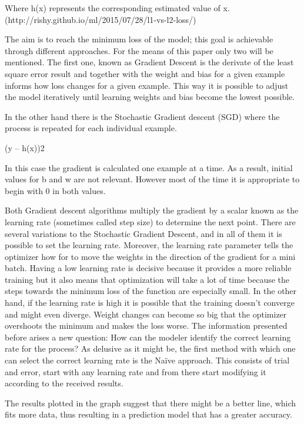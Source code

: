Where h(x) represents the corresponding estimated value of x. (http://rishy.github.io/ml/2015/07/28/l1-vs-l2-loss/)

The aim is to reach the minimum loss of the model; this goal is achievable through different approaches. For the means of this paper only two will be mentioned. The first one, known as Gradient Descent is the derivate of the least square error result and together with the weight and bias for a given example informs how loss changes for a given example. This way it is possible to adjust the model iteratively until learning weights and bias become the lowest possible. 

In the other hand there is the Stochastic Gradient descent (SGD) where the process is repeated for each individual example.

(y – h(x))2

In this case the gradient is calculated one example at a time. As a result, initial values for b and w are not relevant. However most of the time it is appropriate to begin with 0 in both values. 

Both Gradient descent algorithms multiply the gradient by a scalar known as the learning rate (sometimes called step size) to determine the next point.  There are several variations to the Stochastic Gradient Descent, and in all of them it is possible to set the learning rate.  Moreover, the learning rate parameter tells the optimizer how for to move the weights in the direction of the gradient for a mini batch. Having a low learning rate is decisive because it provides a more reliable training but it also means that optimization will take a lot of time because the steps towards the minimum loss of the function are especially small. In the other hand, if the learning rate is high it is possible that the training doesn’t converge and might even diverge.  Weight changes can become so big that the optimizer overshoots the minimum and makes the loss worse. The information presented before arises a new question: How can the modeler identify the correct learning rate for the process? 
As delusive as it might be, the first method with which one can select the correct learning rate is the Naïve approach. This consists of trial and error, start with any learning rate and from there start modifying it according to the received results. 


The results plotted in the graph suggest that there might be a better line, which fits more data, thus resulting in a prediction model that has a greater accuracy.


